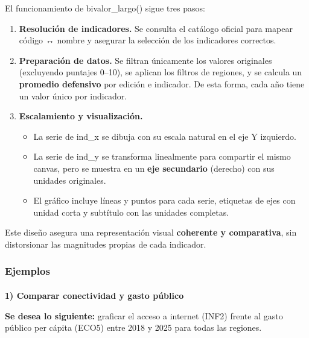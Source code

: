 \documentclass[
  11pt,
  letterpaper,
  DIV=11,
  numbers=noendperiod]{scrartcl}
\makeatletter
\let\oldparagraph\paragraph
\renewcommand{\paragraph}{
    \@ifstar
      \xxxParagraphStar
      \xxxParagraphNoStar
  }
\newcommand{\xxxParagraphStar}[1]{\oldparagraph*{#1}\mbox{}}
\newcommand{\xxxParagraphNoStar}[1]{\oldparagraph{#1}\mbox{}}
\makeatother
\begin{document}
El funcionamiento de bivalor\_largo() sigue tres pasos:

\begin{enumerate}
\def\labelenumi{\arabic{enumi}.}
\item
  \textbf{Resolución de indicadores.} Se consulta el catálogo oficial
  para mapear código ↔ nombre y asegurar la selección de los indicadores
  correctos.
\item
  \textbf{Preparación de datos.} Se filtran únicamente los valores
  originales (excluyendo puntajes 0--10), se aplican los filtros de
  regiones, y se calcula un \textbf{promedio defensivo} por edición e
  indicador. De esta forma, cada año tiene un valor único por indicador.
\item
  \textbf{Escalamiento y visualización.}

  \begin{itemize}
  \item
    La serie de ind\_x se dibuja con su escala natural en el eje Y
    izquierdo.
  \item
    La serie de ind\_y se transforma linealmente para compartir el mismo
    canvas, pero se muestra en un \textbf{eje secundario} (derecho) con
    sus unidades originales.
  \item
    El gráfico incluye líneas y puntos para cada serie, etiquetas de
    ejes con unidad corta y subtítulo con las unidades completas.
  \end{itemize}
\end{enumerate}

Este diseño asegura una representación visual \textbf{coherente y
comparativa}, sin distorsionar las magnitudes propias de cada indicador.

\subsubsection{\texorpdfstring{\textbf{Ejemplos}}{Ejemplos}}\label{ejemplos-20}

\paragraph{\texorpdfstring{\textbf{1) Comparar conectividad y gasto
público}}{1) Comparar conectividad y gasto público}}\label{comparar-conectividad-y-gasto-puxfablico}

\textbf{Se desea lo siguiente:} graficar el acceso a internet (INF2)
frente al gasto público per cápita (ECO5) entre 2018 y 2025 para todas
las regiones.
\end{document}
